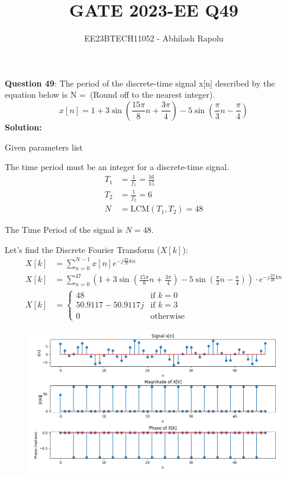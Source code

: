 \documentclass[journal,12pt,twocolumn]{IEEEtran}
\title{GATE 2023-EE Q49}
\author{EE23BTECH11052 - Abhilash Rapolu}
\begin{document}
\maketitle
\newpage
\textbf{Question 49}: The period of the discrete-time signal x[n] described by the equation below is N =\ (Round off to the nearest integer).
$$x[n] = 1 + 3\sin\left(\frac{15\pi}{8}n + \frac{3\pi}{4}\right) - 5\sin\left(\frac{\pi}{3}n - \frac{\pi}{4}\right)$$
\textbf{Solution:}
\fi
\begin{table}[htbp]
\centering
 
\caption{Given parameters list}
\end{table}

The time period must be an integer for a discrete-time signal.
\begin{align}
T_1 &= \frac{1}{f_1} = \frac{16}{15} \\
T_2 &= \frac{1}{f_2} = 6 \\
N &= \text{LCM}(T_1, T_2) = 48
\end{align}

The Time Period of the signal is \(N = 48\).

Let's find the Discrete Fourier Transform (\(X[k]\)):
\begin{align}
X[k] &= \sum_{n=0}^{N-1} x[n]e^{-j\frac{2\pi}{N}kn} \\
X[k] &= \sum_{n=0}^{47} \left(1 + 3\sin\left(\frac{15\pi}{8}n + \frac{3\pi}{4}\right) 
- 5\sin\left(\frac{\pi}{3}n - \frac{\pi}{4}\right)\right) \cdot e^{-j\frac{2\pi}{48}kn} \\
X[k] &= \begin{cases}
    48 & \text{if } k = 0 \\
    50.9117 - 50.9117j & \text{if } k = 3 \\
    0 & \text{otherwise}
\end{cases}
\end{align}

\begin{figure}[!ht] 
\centering
\includegraphics[width=1\columnwidth]{2023/EE/49/figs/Figure1.png}
\label{fig:Graph1}
\end{figure}

\end{document}
